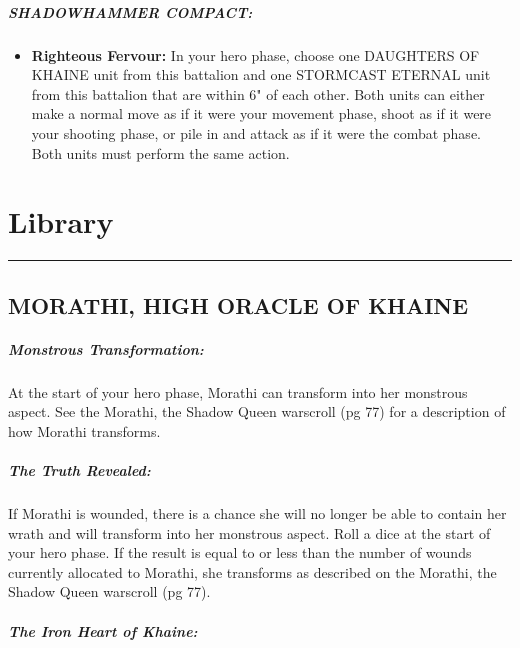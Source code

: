 \hypertarget{shadowhammer-compact}{%
\subparagraph{SHADOWHAMMER COMPACT:}\label{shadowhammer-compact}}

\begin{itemize}
\tightlist
\item
  \textbf{Righteous Fervour:} In your hero phase, choose one DAUGHTERS
  OF KHAINE unit from this battalion and one STORMCAST ETERNAL unit from
  this battalion that are within 6" of each other. Both units can either
  make a normal move as if it were your movement phase, shoot as if it
  were your shooting phase, or pile in and attack as if it were the
  combat phase. Both units must perform the same action.
\end{itemize}

\hypertarget{library}{%
\section{Library}\label{library}}

\begin{center}\rule{0.5\linewidth}{\linethickness}\end{center}

\hypertarget{morathi-high-oracle-of-khaine}{%
\subsection{MORATHI, HIGH ORACLE OF
KHAINE}\label{morathi-high-oracle-of-khaine}}

\hypertarget{monstrous-transformation}{%
\subparagraph{Monstrous
Transformation:}\label{monstrous-transformation}}

At the start of your hero phase, Morathi can transform into her
monstrous aspect. See the Morathi, the Shadow Queen warscroll (pg 77)
for a description of how Morathi transforms.

\hypertarget{the-truth-revealed}{%
\subparagraph{The Truth Revealed:}\label{the-truth-revealed}}

If Morathi is wounded, there is a chance she will no longer be able to
contain her wrath and will transform into her monstrous aspect. Roll a
dice at the start of your hero phase. If the result is equal to or less
than the number of wounds currently allocated to Morathi, she transforms
as described on the Morathi, the Shadow Queen warscroll (pg 77).

\hypertarget{the-iron-heart-of-khaine}{%
\subparagraph{The Iron Heart of
Khaine:}\label{the-iron-heart-of-khaine}}

